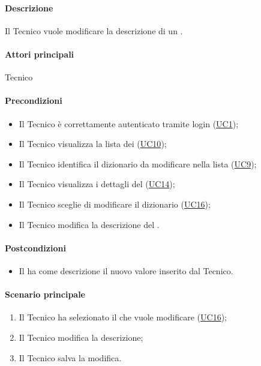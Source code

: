 \paragraph*{Descrizione}
Il Tecnico vuole modificare la descrizione di un .

\paragraph*{Attori principali}
Tecnico

\paragraph*{Precondizioni}
\begin{itemize}
  \item Il Tecnico è correttamente autenticato tramite login (\hyperref[UC1]{UC1});
  \item Il Tecnico visualizza la lista dei  (\hyperref[UC10]{UC10});
  \item Il Tecnico identifica il dizionario da modificare nella lista (\hyperref[UC9]{UC9});
  \item Il Tecnico visualizza i dettagli del  (\hyperref[UC14]{UC14});
  \item Il Tecnico sceglie di modificare il dizionario (\hyperref[UC16]{UC16});
  \item Il Tecnico modifica la descrizione del .
\end{itemize}

\paragraph*{Postcondizioni}
\begin{itemize}
  \item Il  ha come descrizione il nuovo valore inserito dal Tecnico.
\end{itemize}

\paragraph*{Scenario principale}
\begin{enumerate}
  \item Il Tecnico ha selezionato il  che vuole modificare (\hyperref[UC16]{UC16});
  \item Il Tecnico modifica la descrizione;
  \item Il Tecnico salva la modifica.
\end{enumerate}

